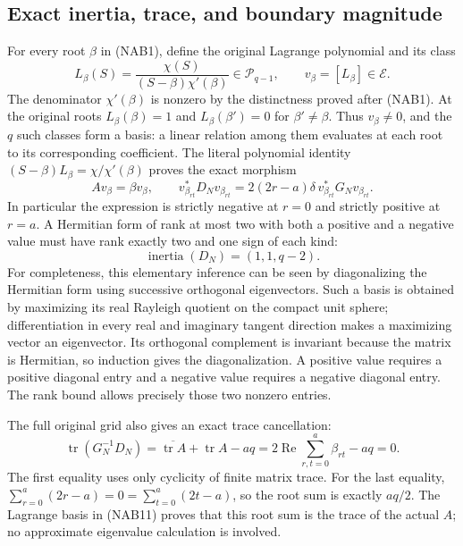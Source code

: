 \subsection{Exact inertia, trace, and boundary magnitude}

For every root \(\beta\) in (NAB1), define the original Lagrange
polynomial and its class
\begin{equation}
 L_\beta(S)=\frac{\chi(S)}{(S-\beta)\chi'(\beta)}
       \in\mathcal P_{q-1},\qquad
 v_\beta=[L_\beta]\in\mathcal E .
 \tag{NAB11}\label{eq:NAB11}
\end{equation}
The denominator \(\chi'(\beta)\) is nonzero by the distinctness proved
after (NAB1).  At the original roots \(L_\beta(\beta)=1\) and
\(L_\beta(\beta')=0\) for \(\beta'\ne\beta\).
Thus \(v_\beta\ne0\), and the \(q\) such classes form a basis: a linear
relation among them evaluates at each root to its corresponding
coefficient.  The literal polynomial identity
\((S-\beta)L_\beta=\chi/\chi'(\beta)\) proves the exact morphism
\begin{equation}
 Av_\beta=\beta v_\beta,\qquad
 v_{\beta_{rt}}^*D_Nv_{\beta_{rt}}
      =2(2r-a)\delta\,v_{\beta_{rt}}^*G_Nv_{\beta_{rt}} .
 \tag{NAB12}\label{eq:NAB12}
\end{equation}
In particular the expression is strictly negative at \(r=0\) and
strictly positive at \(r=a\).
A Hermitian form of rank at most two with both a positive and a negative
value must have rank exactly two and one sign of each kind:
\begin{equation}
 \operatorname{inertia}(D_N)=(1,1,q-2).
 \tag{NAB13}\label{eq:NAB13}
\end{equation}
For completeness, this elementary inference can be seen by diagonalizing
the Hermitian form using successive orthogonal eigenvectors.  Such a
basis is obtained by maximizing its real Rayleigh quotient on the compact
unit sphere; differentiation in every real and imaginary tangent
direction makes a maximizing vector an eigenvector.  Its orthogonal
complement is invariant because the matrix is Hermitian, so induction
gives the diagonalization.  A positive value requires a positive
diagonal entry and a negative value requires a negative diagonal entry.
The rank bound allows precisely those two nonzero entries.

The full original grid also gives an exact trace cancellation:
\begin{equation}
 \operatorname{tr}(G_N^{-1}D_N)
 =\overline{\operatorname{tr}A}+\operatorname{tr}A-aq
 =2\operatorname{Re}\sum_{r,t=0}^{a}\beta_{rt}-aq=0 .
 \tag{NAB14}\label{eq:NAB14}
\end{equation}
The first equality uses only cyclicity of finite matrix trace.
For the last equality,
\(\sum_{r=0}^a(2r-a)=0=\sum_{t=0}^a(2t-a)\), so the root sum
is exactly \(aq/2\).
The Lagrange basis in (NAB11) proves that this root sum is the trace of
the actual \(A\); no approximate eigenvalue calculation is involved.

